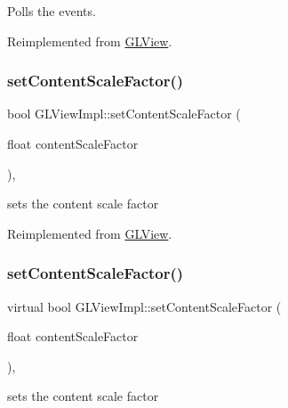 Polls the events. 

Reimplemented from \hyperlink{classGLView_a707854960055e05a3841d4b8cf88f9ce}{G\+L\+View}.

\mbox{\label{classGLViewImpl_a7bd1df076bd10554cc6aff25f2b07238}} 
\subsubsection{\texorpdfstring{set\+Content\+Scale\+Factor()}{setContentScaleFactor()}\hspace{0.1cm}{\footnotesize\ttfamily [1/2]}}
{\footnotesize\ttfamily bool G\+L\+View\+Impl\+::set\+Content\+Scale\+Factor (\begin{DoxyParamCaption}\item[{float}]{content\+Scale\+Factor }\end{DoxyParamCaption})\hspace{0.3cm}{\ttfamily [override]}, {\ttfamily [virtual]}}

sets the content scale factor 

Reimplemented from \hyperlink{classGLView_a40714c1d078f964bb51d12228af98054}{G\+L\+View}.

\mbox{\label{classGLViewImpl_ae5fc53c9751b15efc4a6a1bc12db262c}} 
\subsubsection{\texorpdfstring{set\+Content\+Scale\+Factor()}{setContentScaleFactor()}\hspace{0.1cm}{\footnotesize\ttfamily [2/2]}}
{\footnotesize\ttfamily virtual bool G\+L\+View\+Impl\+::set\+Content\+Scale\+Factor (\begin{DoxyParamCaption}\item[{float}]{content\+Scale\+Factor }\end{DoxyParamCaption})\hspace{0.3cm}{\ttfamily [override]}, {\ttfamily [virtual]}}

sets the content scale factor 

